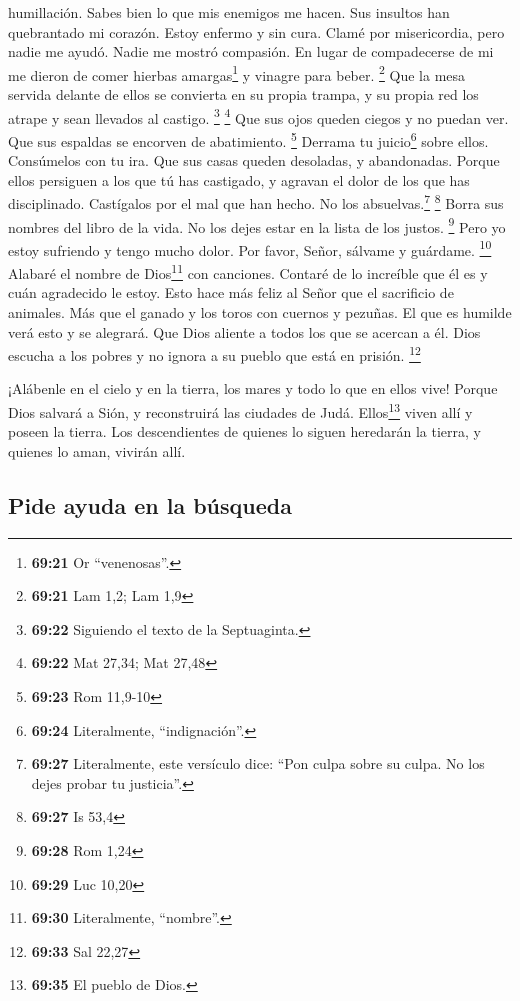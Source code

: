 humillación. Sabes bien lo que mis enemigos me hacen. 
Sus insultos han quebrantado mi corazón. Estoy enfermo y sin cura. Clamé
por misericordia, pero nadie me ayudó. Nadie me mostró compasión.
 En lugar de compadecerse de mi me dieron de comer
hierbas amargas\footnote{\textbf{69:21} Or ``venenosas''.} y vinagre
para beber. \footnote{\textbf{69:21} Lam 1,2; Lam 1,9} 
Que la mesa servida delante de ellos se convierta en su propia trampa, y
su propia red los atrape y sean llevados al castigo. \footnote{\textbf{69:22}
  Siguiendo el texto de la Septuaginta.} \footnote{\textbf{69:22} Mat
  27,34; Mat 27,48}  Que sus ojos queden ciegos y no
puedan ver. Que sus espaldas se encorven de abatimiento. \footnote{\textbf{69:23}
  Rom 11,9-10}  Derrama tu juicio\footnote{\textbf{69:24}
  Literalmente, ``indignación''.} sobre ellos. Consúmelos con tu ira.
 Que sus casas queden desoladas, y abandonadas.
 Porque ellos persiguen a los que tú has castigado, y
agravan el dolor de los que has disciplinado.  Castígalos
por el mal que han hecho. No los absuelvas.\footnote{\textbf{69:27}
  Literalmente, este versículo dice: ``Pon culpa sobre su culpa. No los
  dejes probar tu justicia''.} \footnote{\textbf{69:27} Is 53,4}
 Borra sus nombres del libro de la vida. No los dejes
estar en la lista de los justos. \footnote{\textbf{69:28} Rom 1,24}
 Pero yo estoy sufriendo y tengo mucho dolor. Por favor,
Señor, sálvame y guárdame. \footnote{\textbf{69:29} Luc 10,20}
 Alabaré el nombre de Dios\footnote{\textbf{69:30}
  Literalmente, ``nombre''.} con canciones. Contaré de lo increíble que
él es y cuán agradecido le estoy.  Esto hace más feliz al
Señor que el sacrificio de animales. Más que el ganado y los toros con
cuernos y pezuñas.  El que es humilde verá esto y se
alegrará. Que Dios aliente a todos los que se acercan a él.
 Dios escucha a los pobres y no ignora a su pueblo que
está en prisión. \footnote{\textbf{69:33} Sal 22,27}

 ¡Alábenle en el cielo y en la tierra, los mares y todo
lo que en ellos vive!  Porque Dios salvará a Sión, y
reconstruirá las ciudades de Judá. Ellos\footnote{\textbf{69:35} El
  pueblo de Dios.} viven allí y poseen la tierra.  Los
descendientes de quienes lo siguen heredarán la tierra, y quienes lo
aman, vivirán allí.

\hypertarget{pide-ayuda-en-la-buxfasqueda}{%
\subsection{Pide ayuda en la
búsqueda}\label{pide-ayuda-en-la-buxfasqueda}}

